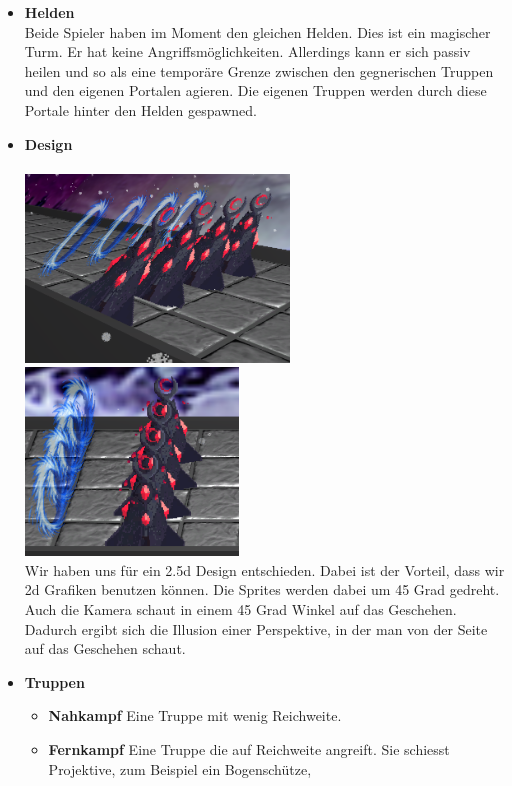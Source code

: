 \begin{itemize}
    \item \textbf{Helden} \\
        Beide Spieler haben im Moment den gleichen Helden. Dies ist ein magischer Turm. Er hat keine Angriffsmöglichkeiten. Allerdings kann er sich passiv heilen und so als eine
        temporäre Grenze zwischen den gegnerischen Truppen und den eigenen Portalen agieren. Die eigenen Truppen werden durch diese Portale hinter den Helden gespawned.
    \item \textbf{Design} \\
        \\
        \includegraphics*[height=5cm]{resources/25d.png} \includegraphics*[height=5cm]{resources/25dtwo.png}\\
        Wir haben uns für ein 2.5d Design entschieden. Dabei ist der Vorteil, dass wir 2d Grafiken benutzen können. Die Sprites werden dabei um 45 Grad gedreht. Auch 
        die Kamera schaut in einem 45 Grad Winkel auf das Geschehen. Dadurch ergibt sich die Illusion einer Perspektive, in der man von der Seite auf das Geschehen schaut. 
    \item \textbf{Truppen}
    \begin{itemize}
        \item \textbf{Nahkampf}
            Eine Truppe mit wenig Reichweite.
        \item \textbf{Fernkampf}
            Eine Truppe die auf Reichweite angreift. Sie schiesst Projektive, zum Beispiel ein Bogenschütze,

\end{itemize}
\end{itemize}
